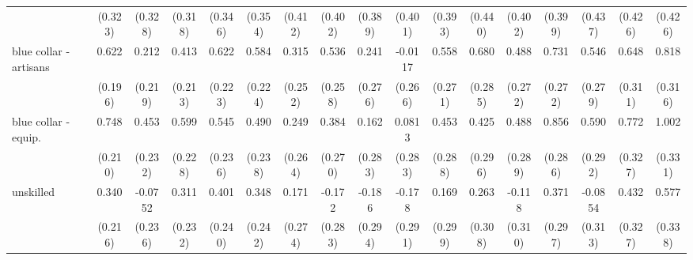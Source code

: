 {\begin{tabular}{l*{16}{c}}
                    &     (0.323)         &     (0.328)         &     (0.318)         &     (0.346)         &     (0.354)         &     (0.412)         &     (0.402)         &     (0.389)         &     (0.401)         &     (0.393)         &     (0.440)         &     (0.402)         &     (0.399)         &     (0.437)         &     (0.426)         &     (0.426)         \\
[1em]
blue collar - artisans&       0.622\sym{**} &       0.212         &       0.413         &       0.622\sym{**} &       0.584\sym{**} &       0.315         &       0.536\sym{*}  &       0.241         &     -0.0117         &       0.558\sym{*}  &       0.680\sym{*}  &       0.488         &       0.731\sym{**} &       0.546         &       0.648\sym{*}  &       0.818\sym{**} \\
                    &     (0.196)         &     (0.219)         &     (0.213)         &     (0.223)         &     (0.224)         &     (0.252)         &     (0.258)         &     (0.276)         &     (0.266)         &     (0.271)         &     (0.285)         &     (0.272)         &     (0.272)         &     (0.279)         &     (0.311)         &     (0.316)         \\
[1em]
blue collar - equip.&       0.748\sym{***}&       0.453         &       0.599\sym{**} &       0.545\sym{*}  &       0.490\sym{*}  &       0.249         &       0.384         &       0.162         &      0.0813         &       0.453         &       0.425         &       0.488         &       0.856\sym{**} &       0.590\sym{*}  &       0.772\sym{*}  &       1.002\sym{**} \\
                    &     (0.210)         &     (0.232)         &     (0.228)         &     (0.236)         &     (0.238)         &     (0.264)         &     (0.270)         &     (0.283)         &     (0.283)         &     (0.288)         &     (0.296)         &     (0.289)         &     (0.286)         &     (0.292)         &     (0.327)         &     (0.331)         \\
[1em]
unskilled           &       0.340         &     -0.0752         &       0.311         &       0.401         &       0.348         &       0.171         &      -0.172         &      -0.186         &      -0.178         &       0.169         &       0.263         &      -0.118         &       0.371         &     -0.0854         &       0.432         &       0.577         \\
                    &     (0.216)         &     (0.236)         &     (0.232)         &     (0.240)         &     (0.242)         &     (0.274)         &     (0.283)         &     (0.294)         &     (0.291)         &     (0.299)         &     (0.308)         &     (0.310)         &     (0.297)         &     (0.313)         &     (0.327)         &     (0.338)         \\

\end{tabular}}
